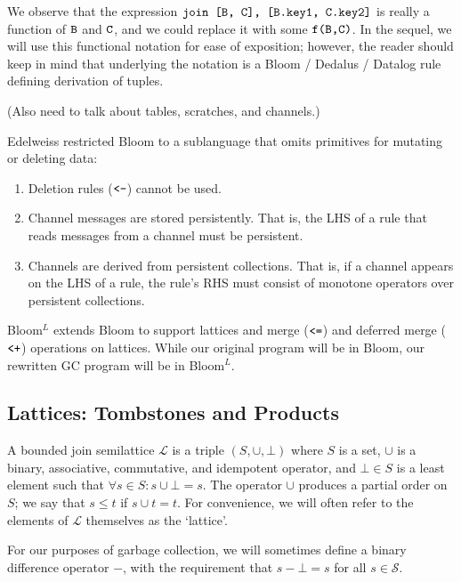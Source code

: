 \documentclass{article}
\numberwithin{equation}{section}
\renewcommand{\tt}[1]{\ifmmode\text{\texttt{#1}}\else\texttt{#1}\fi}
\begin{document}
We observe that the expression $\tt{join [B, C], [B.key1, C.key2]}$ is really a function of $\tt{B}$ and $\tt{C}$, and we could replace it with some $\tt{f(B,C)}$.
In the sequel, we will use this functional notation for ease of exposition; however, the reader should keep in mind that underlying the notation is a Bloom / Dedalus / Datalog rule defining derivation of tuples.

(Also need to talk about tables, scratches, and channels.)

Edelweiss restricted Bloom to a sublanguage that omits primitives for mutating or deleting data:
\begin{enumerate}
\item Deletion rules ($\tt{<-}$) cannot be used.
\item Channel messages are stored persistently. That is, the LHS of a rule that reads messages from a channel must be persistent.
\item Channels are derived from persistent collections. That is, if a channel appears on the LHS of a rule, the rule's RHS must consist of monotone operators over persistent collections.
\end{enumerate}

Bloom$^L$ extends Bloom to support lattices and merge ($\tt{<=}$) and deferred merge ($\tt{<+}$) operations on lattices.
While our original program will be in Bloom, our rewritten GC program will be in  Bloom$^L$.


\subsection{Lattices: Tombstones and Products}
A bounded join semilattice $\mathcal{L}$ is a triple $(S, \cup, \bot)$ where $S$ is a set, $\cup$ is a binary, associative, commutative, and idempotent operator, and $\bot \in S$ is a least element such that $\forall s \in S: s \cup \bot = s$.
The operator $\cup$ produces a partial order on $S$; we say that $s \leq t$ if $s \cup t = t$.
For convenience, we will often refer to the elements of $\mathcal{L}$ themselves as the `lattice'.

For our purposes of garbage collection, we will sometimes define a binary difference operator $-$, with the requirement that $s - \bot = s$ for all $s \in \mathcal{S}$.
\end{document}
